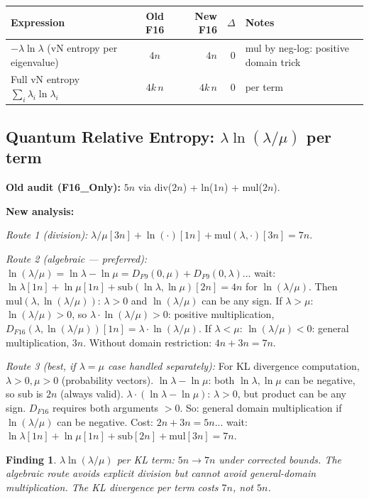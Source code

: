 \documentclass[11pt]{article}
\newtheorem{finding}[theorem]{Finding}
\newcommand{\flag}[1]{\textcolor{flag}{#1}}
\begin{document}
\begin{center}
\begin{tabular}{lcrrl}
\toprule
Expression & Old F16 & New F16 & $\Delta$ & Notes \\
\midrule
$-\lambda\ln\lambda$ (vN entropy per eigenvalue) & $4n$ & $4n$ & $0$ & mul by neg-log: positive domain trick \\
Full vN entropy $\sum_i \lambda_i \ln\lambda_i$ & $4k\,n$ & $4k\,n$ & $0$ & per term \\
\bottomrule
\end{tabular}
\end{center}

\subsection{Quantum Relative Entropy: $\lambda\ln(\lambda/\mu)$ per term}

\textbf{Old audit (F16\_Only):} $5n$ via div($2n$) + ln($1n$) + mul($2n$).

\textbf{New analysis:}

\emph{Route 1 (division):} $\lambda/\mu[3n] + \ln(\cdot)[1n] + \mathrm{mul}(\lambda, \cdot)[3n] = 7n$.

\emph{Route 2 (algebraic --- preferred):}
$\ln(\lambda/\mu) = \ln\lambda - \ln\mu = D_{F9}(0,\mu) + D_{F9}(0,\lambda)$... wait:
$\ln\lambda[1n] + \ln\mu[1n] + \mathrm{sub}(\ln\lambda, \ln\mu)[2n] = 4n$ for $\ln(\lambda/\mu)$.
Then $\mathrm{mul}(\lambda, \ln(\lambda/\mu))$: $\lambda > 0$ and $\ln(\lambda/\mu)$ can be any sign.
If $\lambda > \mu$: $\ln(\lambda/\mu) > 0$, so $\lambda \cdot \ln(\lambda/\mu) > 0$: positive multiplication,
$D_{F16}(\lambda, \ln(\lambda/\mu))[1n] = \lambda \cdot \ln(\lambda/\mu)$.
If $\lambda < \mu$: $\ln(\lambda/\mu) < 0$: general multiplication, $3n$.
Without domain restriction: $4n + 3n = 7n$.

\emph{Route 3 (best, if $\lambda = \mu$ case handled separately):}
For KL divergence computation, $\lambda > 0, \mu > 0$ (probability vectors).
$\ln\lambda - \ln\mu$: both $\ln\lambda, \ln\mu$ can be negative, so sub is $2n$ (always valid).
$\lambda \cdot (\ln\lambda - \ln\mu)$: $\lambda > 0$, but product can be any sign.
$D_{F16}$ requires both arguments $> 0$. So: general domain multiplication if $\ln(\lambda/\mu)$ can be negative.
Cost: $2n + 3n = 5n$... wait: $\ln\lambda[1n] + \ln\mu[1n] + \mathrm{sub}[2n] + \mathrm{mul}[3n] = 7n$.

\begin{finding}
$\lambda\ln(\lambda/\mu)$ per KL term: \flag{$5n \to 7n$} under corrected bounds.
The algebraic route avoids explicit division but cannot avoid general-domain multiplication.
The KL divergence per term costs $7n$, not $5n$.
\end{finding}
\end{document}

